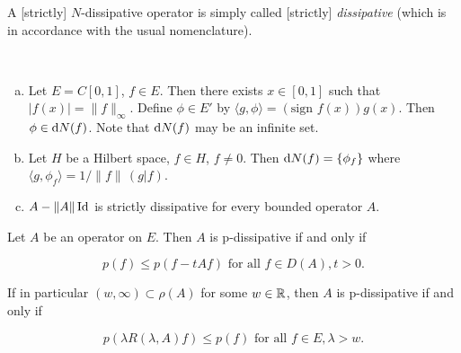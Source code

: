 A [strictly] $N$-dissipative operator is simply called [strictly] \emph{dissipative} (which is in accordance with the usual nomenclature).
\begin{example}\label{ex:a2-2.2}  ~ 
\begin{enumerate}[a), wide, itemsep=1ex]
\item \label{ex:a2-2.2.1}
Let $E = C[0,1]$, $f \in E$.
Then there exists $x \in [0,1]$ such that $|f(x)| = \|f\|_{\infty}$.
Define $\phi \in E'$ by $\langle g,\phi \rangle = (\text{sign } f(x))g(x)$.
Then $\phi \in \mathop{}\!\mathrm{d}{N}(f)$.
Note that $\mathop{}\!\mathrm{d}{N}(f)$ may be an infinite set.
\item \label{ex:a2-2.2.2}
Let $H$ be a Hilbert space, $f \in H$, $f \neq 0$.
Then  $\mathop{}\!\mathrm{d}{N}(f) = \{\phi_{f}\}$ where \\
$\langle g,\phi_{f} \rangle = 1/\|f\|\,(g|f)$.
\item \label{ex:a2-2.2.3}
$A - \|A\|\operatorname{Id}$ is strictly dissipative for every bounded operator $A$.
\end{enumerate}
\end{example}
\begin{proposition}\label{prop:a2-2.3}
Let $A$ be an operator on $E$.
Then $A$ is p-dissipative if and only if

\begin{equation} \label{eq:a2-2.7}
p(f) \leq p(f - tAf) \text{ for all } f \in D(A), t > 0.
\end{equation}

If in particular $(w,\infty) \subset \rho(A)$ for some $w \in \mathbb{R}$, then $A$ is p-dissipative if and only if

\begin{equation}\label{eq:a2-2.8}
p(\lambda R(\lambda,A)f) \leq p(f) \text{ for all } f \in E, \lambda > w.
\end{equation}
\end{proposition}

